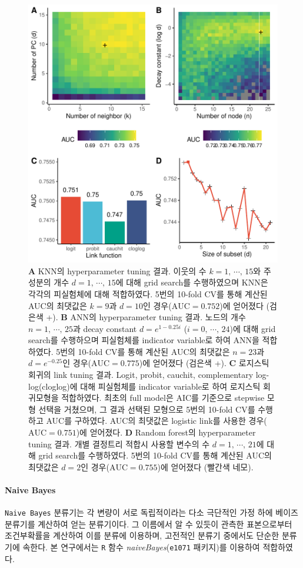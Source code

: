 \documentclass[10pt,onecolumn,twoside,a4size]{gsag3jnl}
\begin{document}
\begin{figure}[tp]
  \renewcommand{\familydefault}{\sfdefault}\normalfont
  \centering
  \includegraphics[width=0.7\linewidth]{tune.pdf}
  \caption{\small\textbf{A} KNN의 hyperparameter tuning 결과. 이웃의 수 $k=1,\,\cdots,\,15$와 주성분의 개수 $d=1,\,\cdots,\,15$에 대해 grid search를 수행하였으며 KNN은 각각의 피실험체에 대해 적합하였다. 5번의 10-fold CV를 통해 계산된 AUC의 최댓값은 $k=9$과 $d=10$인 경우($\mathrm{AUC}=0.752$)에 얻어졌다 (검은색 +). \textbf{B} ANN의 hyperparameter tuning 결과. 노드의 개수 $n=1,\,\cdots,\,25$과 decay constant $d=e^{1-0.25i}$ ($i=0,\,\cdots,\,24$)에 대해 grid search를 수행하으며 피실험체를 indicator variable로 하여 ANN을 적합하였다. 5번의 10-fold CV를 통해 계산된 AUC의 최댓값은 $n=23$과 $d=e^{-0.25}$인 경우($\mathrm{AUC}=0.775$)에 얻어졌다 (검은색 +). \textbf{C} 로지스틱 회귀의 link tuning 결과. Logit, probit, cauchit, complementary log-log(cloglog)에 대해 피실험체를 indicator variable로 하여 로지스틱 회귀모형을 적합하였다. 최초의 full model은 AIC를 기준으로 stepwise 모형 선택을 거쳤으며, 그 결과 선택된 모형으로 5번의 10-fold CV를 수행하고 AUC를 구하였다. AUC의 최댓값은 logistic link를 사용한 경우($\mathrm{AUC}=0.751$)에 얻어졌다. \textbf{D} Random forest의 hyperparameter tuning 결과. 개별 결정트리 적합시 사용할 변수의 수 $d=1,\,\cdots,\,21$에 대해 grid search를 수행하였다. 5번의 10-fold CV를 통해 계산된 AUC의 최댓값은 $d=2$인 경우($\mathrm{AUC}=0.755$)에 얻어졌다 (빨간색 네모).}
  \label{fig:tune}
\end{figure}

\paragraph{Naive Bayes} 
\texttt{Naive Bayes} 분류기는 각 변량이 서로 독립적이라는 다소 극단적인 가정 하에 베이즈 분류기를 계산하여 얻는 분류기이다. 그 이름에서 알 수 있듯이 관측한 표본으로부터 조건부확률을 계산하여 이를 분류에 이용하며, 고전적인 분류기 중에서도 단순한 분류기에 속한다. 본 연구에서는 \texttt{R} 함수 \textit{naiveBayes}(\texttt{e1071} 패키지)를 이용하여 적합하였다.
\end{document}
